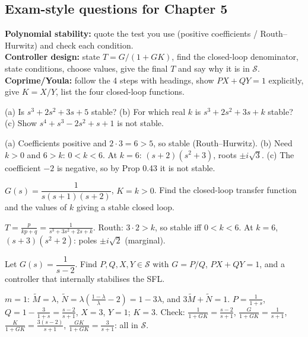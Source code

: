 \subsection{Exam-style questions for Chapter 5}\label{ss:5-11}
\begin{answerbox}
\textbf{Polynomial stability:} quote the test you use (positive coefficients / Routh--Hurwitz) and check each condition.\\
\textbf{Controller design:} state $T=G/(1+GK)$, find the closed-loop denominator, state conditions, choose values, give the final $T$ and say why it is in $\mathcal S$.\\
\textbf{Coprime/Youla:} follow the 4 steps with headings, show $PX+QY=1$ explicitly, give $K=X/Y$, list the four closed-loop functions.
\end{answerbox}
\begin{qbox}[title={Q5.1 (stable polynomials)}]
(a) Is $s^3+2s^2+3s+5$ stable? (b) For which real $k$ is $s^3+2s^2+3s+k$ stable? (c) Show $s^4+s^3-2s^2+s+1$ is not stable.
\end{qbox}
\begin{solbox}
(a) Coefficients positive and $2\cdot3=6>5$, so stable (Routh--Hurwitz). (b) Need $k>0$ and $6>k$: $0<k<6$. At $k=6$: $(s+2)(s^2+3)$, roots $\pm i\sqrt3$.
(c) The coefficient $-2$ is negative, so by Prop 0.43 it is not stable.
\end{solbox}

\begin{qbox}[title={Q5.2 (proportional feedback)}]
$G(s)=\dfrac{1}{s(s+1)(s+2)}$, $K=k>0$. Find the closed-loop transfer function and the values of $k$ giving a stable closed loop.
\end{qbox}
\begin{solbox}
$T=\frac{p}{kp+q}=\frac{1}{s^3+3s^2+2s+k}$. Routh: $3\cdot2>k$, so stable iff $0<k<6$. At $k=6$, $(s+3)(s^2+2)$: poles $\pm i\sqrt2$ (marginal).
\end{solbox}

\begin{qbox}[title={Q5.3 (coprime factorisation and Youla)}]
Let $G(s)=\dfrac{1}{s-2}$. Find $P,Q,X,Y\in\mathcal S$ with $G=P/Q$, $PX+QY=1$, and a controller that internally stabilises the SFL.
\end{qbox}
\begin{solbox}
$m=1$: $\tilde M=\lambda$, $\tilde N=\lambda(\frac{1-\lambda}\lambda-2)=1-3\lambda$, and $3\tilde M+\tilde N=1$.
$P=\frac1{1+s}$, $Q=1-\frac3{1+s}=\frac{s-2}{s+1}$, $X=3$, $Y=1$; $K=3$.
Check: $\frac1{1+GK}=\frac{s-2}{s+1}$, $\frac{G}{1+GK}=\frac1{s+1}$, $\frac{K}{1+GK}=\frac{3(s-2)}{s+1}$, $\frac{GK}{1+GK}=\frac{3}{s+1}$: all in $\mathcal S$.
\end{solbox}

